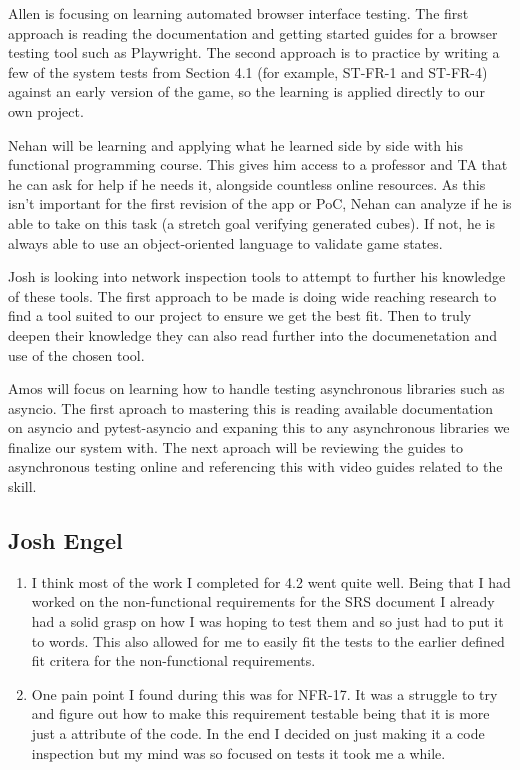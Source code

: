 \documentclass[12pt, titlepage]{article}
\begin{document}
\begin{enumerate}
  Allen is focusing on learning automated browser interface testing. The first approach is reading the documentation and getting started guides for a browser testing tool such as Playwright. The second approach is to practice by writing a few of the system tests from Section 4.1 (for example, ST-FR-1 and ST-FR-4) against an early version of the game, so the learning is applied directly to our own project.

  Nehan will be learning and applying what he learned side by side with his functional programming course. This gives him access to a professor and TA that he can ask for help if he needs it, alongside countless online resources. As this isn't important for the first revision of the app or PoC, Nehan can analyze if he is able to take on this task (a stretch goal verifying generated cubes). If not, he is always able to use an object-oriented language to validate game states.
  
  Josh is looking into network inspection tools to attempt to further his knowledge of these tools. The first approach to be made is doing wide reaching research to find a tool suited to our project to ensure we get the best fit. Then to truly deepen their knowledge they can also read further into the documenetation and use of the chosen tool.
  
  Amos will focus on learning how to handle testing asynchronous libraries such as asyncio. The first aproach to mastering this is reading available documentation on asyncio and pytest-asyncio and expaning this to any asynchronous libraries we finalize our system with. The next aproach will be reviewing the guides to asynchronous testing online and referencing this with video guides related to the skill.
\end{enumerate}

\subsection*{Josh Engel}

\begin{enumerate}
  \item I think most of the work I completed for 4.2 went quite well. Being that I had worked on the non-functional 
  requirements for the SRS document I already had a solid grasp on how I was hoping to test them and so just had 
  to put it to words. This also allowed for me to easily fit the tests to the earlier defined fit critera for the 
  non-functional requirements.
  \item One pain point I found during this was for NFR-17. It was a struggle to try and figure out how to make 
  this requirement testable being that it is more just a attribute of the code. In the end I decided on just making 
  it a code inspection but my mind was so focused on tests it took me a while.
\end{enumerate}
\end{document}
